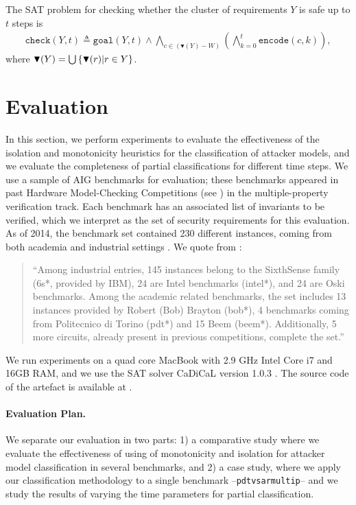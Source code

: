 The SAT problem for checking whether the cluster of requirements $Y$ is safe up to $t$ steps is
\begin{align} 
\label{eq:MasterEq}
\mathtt{check}(Y,t)\triangleq\mathtt{goal}(Y,t)\land\! \bigwedge_{c\in (\blacktriangledown(Y)- W)}\left( \bigwedge_{k=0}^{t}{\mathtt{encode}(c,k)}\right),
\end{align}
where $\blacktriangledown(Y)=\bigcup \left\{\blacktriangledown(r)| r\in Y\right\}$.


\section{Evaluation}
\label{sec:evaluation}
In this section, we perform experiments to evaluate the effectiveness of the isolation and monotonicity heuristics for the classification of attacker models, and we evaluate the completeness of partial classifications for different time steps. We use a sample of AIG benchmarks for evaluation; these benchmarks appeared in past Hardware Model-Checking Competitions (see \cite{HWMCC2011,HWMCC2013}) in the multiple-property verification track. Each benchmark has an associated list of invariants to be verified, which we interpret as the set of security requirements for  this evaluation. As of 2014, the benchmark set contained 230 different instances, coming from both academia and industrial settings \cite{HWMCC2014BM}. We quote from \cite{HWMCC2014BM}:
\begin{quote}
``Among industrial entries, 145 instances
belong to the SixthSense family (6s*, provided by IBM), 24 are Intel benchmarks (intel*),
and 24 are Oski benchmarks. Among the academic related benchmarks, the set includes 13
instances provided by Robert (Bob) Brayton (bob*), 4 benchmarks coming from Politecnico
di Torino (pdt*) and 15 Beem (beem*). Additionally, 5 more circuits, already present in
previous competitions, complete the set.''
\end{quote}
We run experiments on a quad core MacBook with 2.9 GHz Intel Core i7 and 16GB RAM, and we use the SAT solver CaDiCaL version 1.0.3 \cite{Cadical}. The source code of the artefact is available at \cite{aig-ac-asset}.

\paragraph{Evaluation Plan.} We separate our evaluation in two parts: 1) a comparative study where we evaluate the effectiveness of using of monotonicity and isolation for attacker model classification in several benchmarks, and 2) a case study, where we apply our classification methodology to a single benchmark --\texttt{pdtvsarmultip}-- and we study the results of varying the time parameters for partial classification.

